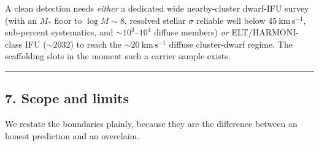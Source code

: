 \documentclass[
]{article}
\begin{document}
A clean detection needs \emph{either} a dedicated wide nearby-cluster
dwarf-IFU survey (with an \(M_\ast\) floor to \(\log M\sim8\), resolved
stellar \(\sigma\) reliable well below \(45\ \mathrm{km\,s^{-1}}\),
sub-percent systematics, and \(\sim10^3\)--\(10^4\) diffuse members)
\emph{or} ELT/HARMONI-class IFU (\(\sim2032\)) to reach the
\(\sim20\ \mathrm{km\,s^{-1}}\) diffuse cluster-dwarf regime. The
scaffolding slots in the moment such a carrier sample exists.

\begin{center}\rule{0.5\linewidth}{0.5pt}\end{center}

\subsection{7. Scope and limits}\label{scope-and-limits}

We restate the boundaries plainly, because they are the difference
between an honest prediction and an overclaim.
\end{document}
